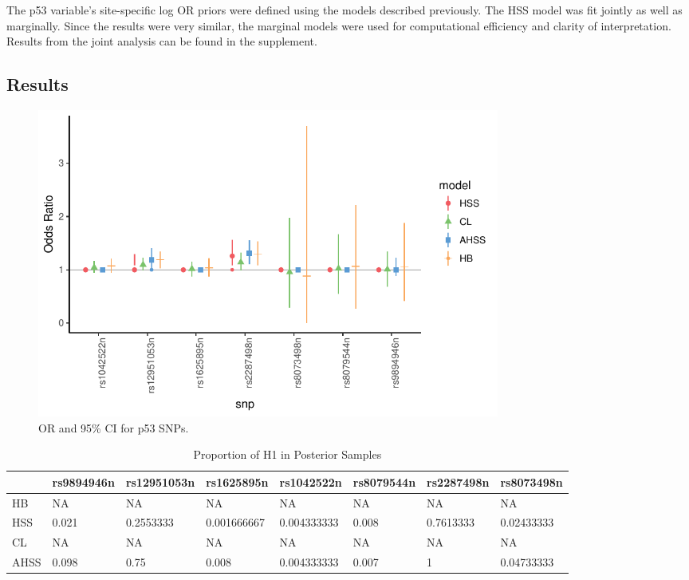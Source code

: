\documentclass[AMA,STIX1COL]{WileyNJD-v2}\usepackage[]{graphicx}\usepackage[]{color}
\newenvironment{knitrout}{}{} %
\begin{document}
The p53 variable's site-specific log OR priors were defined using the models described previously. The HSS model was fit jointly as well as marginally. Since the results were very similar, the marginal models were used for computational efficiency and clarity of interpretation. Results from the joint analysis can be found in the supplement.

\subsection{Results}








\begin{figure}
\caption{OR and 95\% CI for p53 SNPs.}
\begin{knitrout}
\color{fgcolor}

{\centering \includegraphics[width=6in]{figure/unnamed-chunk-30-1} 

}



\end{knitrout}
\end{figure}

\begin{knitrout}
\color{fgcolor}\begin{table}

\caption{\label{tab:unnamed-chunk-31}Proportion of H1 in Posterior Samples}
\centering
\begin{tabular}[t]{l|l|l|l|l|l|l|l}
\hline
  & rs9894946n & rs12951053n & rs1625895n & rs1042522n & rs8079544n & rs2287498n & rs8073498n\\
\hline
HB & NA & NA & NA & NA & NA & NA & NA\\
\hline
HSS & 0.021 & 0.2553333 & 0.001666667 & 0.004333333 & 0.008 & 0.7613333 & 0.02433333\\
\hline
CL & NA & NA & NA & NA & NA & NA & NA\\
\hline
AHSS & 0.098 & 0.75 & 0.008 & 0.004333333 & 0.007 & 1 & 0.04733333\\
\hline
\end{tabular}
\end{table}


\end{knitrout}
\end{document}
